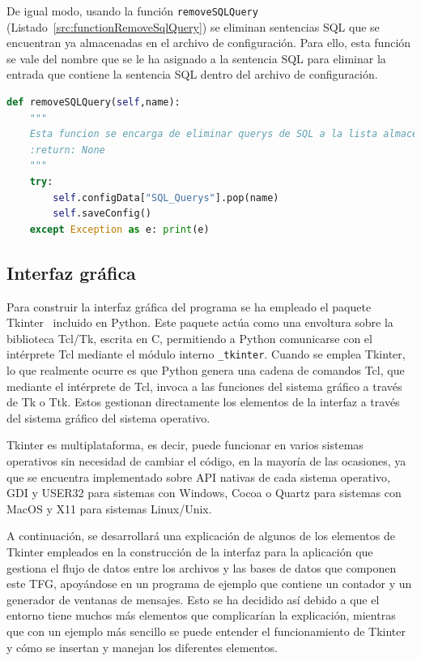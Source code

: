 De igual modo, usando la función \texttt{removeSQLQuery} (Listado~\ref{src:functionRemoveSqlQuery}) se eliminan sentencias \acrshort{SQL} que se encuentran ya almacenadas en el archivo de configuración. Para ello, esta función se vale del nombre que se le ha asignado a la sentencia \acrshort{SQL} para eliminar la entrada que contiene la sentencia \acrshort{SQL} dentro del archivo de configuración.

\begin{lstlisting}[language=Python,
                   style=python,
                   frame=none,
                   numbers=none,
                   basicstyle=\ttfamily\normalsize,
                   caption={Función \texttt{removeSQLQuery}},
                   label=src:functionRemoveSqlQuery,
                   inputencoding=utf8]                   
def removeSQLQuery(self,name):
    """
    Esta funcion se encarga de eliminar querys de SQL a la lista almacenada en el archivo de configuracion
    :return: None
    """
    try:
        self.configData["SQL_Querys"].pop(name)
        self.saveConfig()
    except Exception as e: print(e)
\end{lstlisting}

\subsection{Interfaz gráfica}

Para construir la interfaz gráfica del programa se ha empleado el paquete Tkinter~\cite{Tkinter} incluido en Python. Este paquete actúa como una envoltura sobre la biblioteca Tcl/Tk, escrita en C, permitiendo a Python comunicarse con el intérprete \acrfull{Tcl} mediante el módulo interno \texttt{\_tkinter}. Cuando se emplea Tkinter, lo que realmente ocurre es que Python genera una cadena de comandos \acrshort{Tcl}, que mediante el intérprete de Tcl, invoca a las funciones del sistema gráfico a través de Tk o Ttk. Estos gestionan directamente los elementos de la interfaz a través del sistema gráfico del sistema operativo.

Tkinter es multiplataforma, es decir, puede funcionar en varios sistemas operativos sin necesidad de cambiar el código, en la mayoría de las ocasiones, ya que se encuentra implementado sobre \acrfull{API} nativas de cada sistema operativo, \acrfull{GDI} y USER32 para sistemas con Windows, Cocoa o Quartz para sistemas con MacOS y X11 para sistemas Linux/Unix.

A continuación, se desarrollará una explicación de algunos de los elementos de Tkinter empleados en la construcción de la interfaz para la aplicación que gestiona el flujo de datos entre los archivos y las bases de datos que componen este \acrshort{TFG}, apoyándose en un programa de ejemplo que contiene un contador y un generador de ventanas de mensajes. Esto se ha decidido así debido a que el entorno tiene muchos más elementos que complicarían la explicación, mientras que con un ejemplo más sencillo se puede entender el funcionamiento de Tkinter y cómo se insertan y manejan los diferentes elementos.


